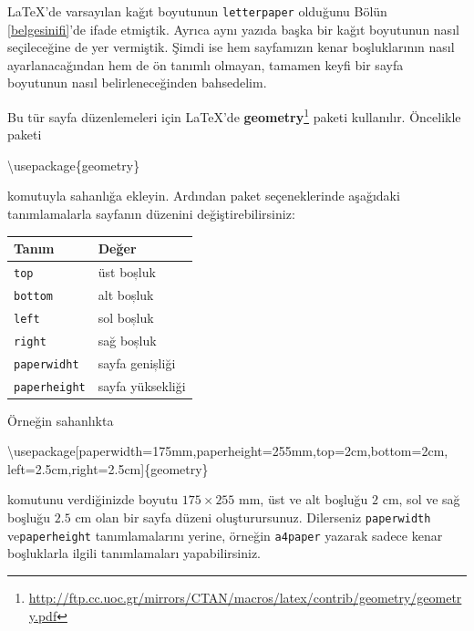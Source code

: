 \documentclass[
  10pt,
]{scrbook}
\newenvironment{Shaded}{}{}
\newcommand{\BuiltInTok}[1]{#1}
\newcommand{\ExtensionTok}[1]{#1}
\newcommand{\NormalTok}[1]{#1}
\renewcommand{\href}[2]{#2\footnote{\url{#1}}}
\theoremstyle{definition}
\theoremstyle{definition}
\theoremstyle{definition}
\theoremstyle{definition}
\theoremstyle{remark}
\begin{document}
LaTeX'de varsayılan kağıt boyutunun \texttt{letterpaper} olduğunu Bölün \ref{belgesinifi}'de ifade etmiştik. Ayrıca aynı yazıda başka bir kağıt boyutunun nasıl seçileceğine de yer vermiştik. Şimdi ise hem sayfamızın kenar boşluklarının nasıl ayarlanacağından hem de ön tanımlı olmayan, tamamen keyfi bir sayfa boyutunun nasıl belirleneceğinden bahsedelim.

Bu tür sayfa düzenlemeleri için LaTeX'de \href{http://ftp.cc.uoc.gr/mirrors/CTAN/macros/latex/contrib/geometry/geometry.pdf}{\textbf{geometry}} paketi kullanılır. Öncelikle paketi

\begin{Shaded}
\begin{Highlighting}[]
\BuiltInTok{\textbackslash{}usepackage}\NormalTok{\{}\ExtensionTok{geometry}\NormalTok{\}}
\end{Highlighting}
\end{Shaded}

komutuyla sahanlığa ekleyin. Ardından paket seçeneklerinde aşağıdaki tanımlamalarla sayfanın düzenini değiştirebilirsiniz:

\begin{longtable}[]{@{}ll@{}}
\toprule
Tanım & Değer \\
\midrule
\endhead
\texttt{top} & üst boșluk \\
\texttt{bottom} & alt boșluk \\
\texttt{left} & sol boșluk \\
\texttt{right} & sağ boșluk \\
\texttt{paperwidht} & sayfa genișliği \\
\texttt{paperheight} & sayfa yüksekliği \\
\bottomrule
\end{longtable}

Örneğin sahanlıkta

\begin{Shaded}
\begin{Highlighting}[]
\BuiltInTok{\textbackslash{}usepackage}\NormalTok{[paperwidth=175mm,paperheight=255mm,top=2cm,bottom=2cm,}
\NormalTok{left=2.5cm,right=2.5cm]\{}\ExtensionTok{geometry}\NormalTok{\}}
\end{Highlighting}
\end{Shaded}

komutunu verdiğinizde boyutu \(175\times 255\) mm, üst ve alt boşluğu \(2\) cm, sol ve sağ boşluğu \(2.5\) cm olan bir sayfa düzeni oluşturursunuz. Dilerseniz \texttt{paperwidth} ve\texttt{paperheight} tanımlamalarını yerine, örneğin \texttt{a4paper} yazarak sadece kenar boşluklarla ilgili tanımlamaları yapabilirsiniz.
\end{document}
